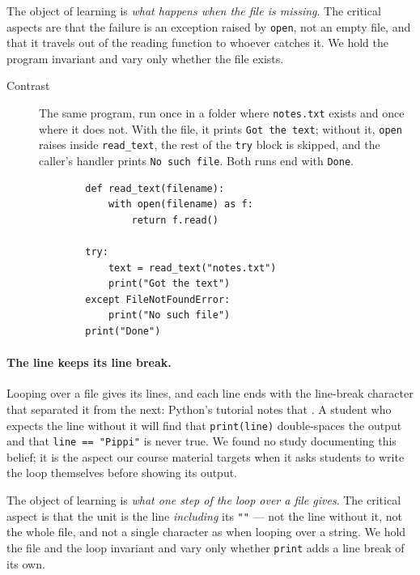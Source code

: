 The object of learning is \emph{what happens when the file is missing}.
The critical aspects are that the failure is an exception raised by
\texttt{open}, not an empty file, and that it travels out of
the reading function to whoever catches it.
We hold the program invariant and vary only whether the file exists.

\begin{description}
  \item[Contrast] The same program, run once in a folder where
    \texttt{notes.txt} exists and once where it does not.
    With the file, it prints \texttt{Got the text}; without it,
    \texttt{open} raises inside \texttt{read_text},
    the rest of the \texttt{try} block is skipped, and the
    caller's handler prints \texttt{No such file}.
    Both runs end with \texttt{Done}.

    \hfill
    \begin{minipage}[t]{0.6\columnwidth}
      \begin{verbatim}
        def read_text(filename):
            with open(filename) as f:
                return f.read()

        try:
            text = read_text("notes.txt")
            print("Got the text")
        except FileNotFoundError:
            print("No such file")
        print("Done")
      \end{verbatim}
    \end{minipage}
    \hfill\null
\end{description}

\paragraph{The line keeps its line break.}
Looping over a file gives its lines, and each line ends with the
line-break character that separated it from the next: Python's tutorial
notes that .
A student who expects the line without it will find that
\texttt{print(line)} double-spaces the output and that
\texttt{line == "Pippi"} is never true.
We found no study documenting this belief; it is the aspect our course
material targets when it asks students to write the loop themselves before
showing its output.

The object of learning is \emph{what one step of the loop over a file
gives}.
The critical aspect is that the unit is the line \emph{including} its
\texttt{"\n"} --- not the line without it, not the whole file,
and not a single character as when looping over a string.
We hold the file and the loop invariant and vary only whether
\texttt{print} adds a line break of its own.

